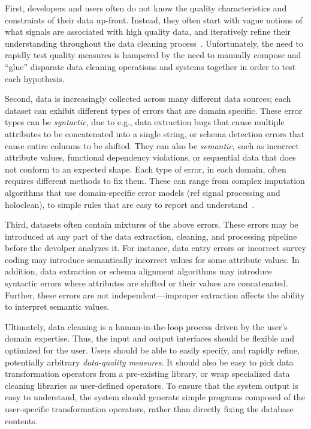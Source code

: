 
First, developers and users often do not know the quality characteristics and constraints of their data up-front.  Instead, they often start with vague notions of what signals are associated with high quality data, and iteratively refine their understanding throughout the data cleaning process~\cite{}.  Unfortunately, the need to rapidly test quality measures is hampered by the need to manually compose and ``glue'' disparate data cleaning operations and systems together in order to test each hypothesis.  

Second, data is increasingly collected across many different data sources; each dataset can exhibit different types of errors that are domain specific.  These error types can be {\it syntactic}, due to e.g., data extraction bugs that cause multiple attributes to be concatenated into a single string, or schema detection errors that cause entire columns to be shifted.  They can also be {\it semantic}, such as incorrect attribute values, functional dependency violations, or sequential data that does not conform to an expected shape.   Each type of error, in each domain, often requires different methods to fix them.  These can range from complex imputation algorithms that use domain-specific error models (ref signal processing and holoclean), to simple rules that are easy to report and understand~\cite{}.  

Third, datasets often contain mixtures of the above errors.  These errors may be introduced at any part of the data extraction, cleaning, and processing pipeline before the devolper analyzes it.  For instance, data entry errors or incorrect survey coding may introduce semantically incorrect values for some attribute values.  In addition, data extraction or schema alignment algorithms may introduce syntactic errors where attributes are shifted or their values are concatenated.  Further, these errors are not independent---improper extraction affects the ability to interpret semantic values.  



Ultimately, data cleaning is a human-in-the-loop process driven by the user's domain expertise.  Thus, the input and output interfaces should be flexible and optimized for the user.   Users should be able to easily specify, and rapidly refine, potentially arbitrary {\it data-quality measures}.  It should also be easy to pick data transformation operators from a pre-existing library, or wrap specialized data cleaning libraries as user-defined operators.  To ensure that the system output is easy to understand, the system should generate simple programs composed of the user-specific transformation operators, rather than directly fixing the database contents.




